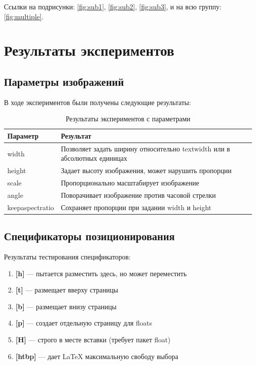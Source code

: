 \documentclass[12pt,a4paper]{article}
\begin{document}
Ссылки на подрисунки: \ref{fig:sub1}, \ref{fig:sub2}, \ref{fig:sub3}, и на всю группу: \ref{fig:multiple}.

\section{Результаты экспериментов}

\subsection{Параметры изображений}

В ходе экспериментов были получены следующие результаты:

\begin{table}[h]
\centering
\caption{Результаты экспериментов с параметрами}
\label{tab:results}
\begin{tabular}{|l|p{8cm}|}
\hline
\textbf{Параметр} & \textbf{Результат} \\
\hline
width & Позволяет задать ширину относительно textwidth или в абсолютных единицах \\
\hline
height & Задает высоту изображения, может нарушить пропорции \\
\hline
scale & Пропорционально масштабирует изображение \\
\hline
angle & Поворачивает изображение против часовой стрелки \\
\hline
keepaspectratio & Сохраняет пропорции при задании width и height \\
\hline
\end{tabular}
\end{table}

\subsection{Спецификаторы позиционирования}

Результаты тестирования спецификаторов:

\begin{enumerate}
    \item \textbf{[h]} — пытается разместить здесь, но может переместить
    \item \textbf{[t]} — размещает вверху страницы
    \item \textbf{[b]} — размещает внизу страницы
    \item \textbf{[p]} — создает отдельную страницу для floats
    \item \textbf{[H]} — строго в месте вставки (требует пакет float)
    \item \textbf{[htbp]} — дает LaTeX максимальную свободу выбора
\end{enumerate}
\end{document}
